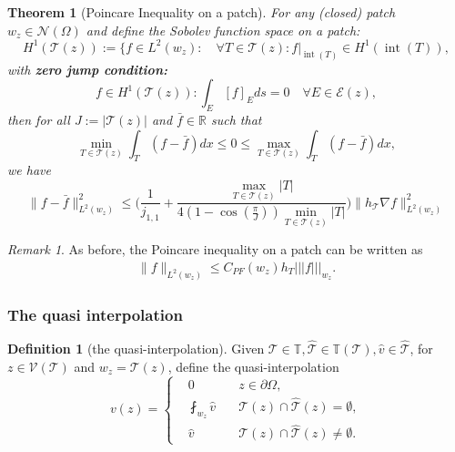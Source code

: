 \documentclass[a4paper,12pt,oneside,fleqn]{book}
\newtheorem{theorem}{Theorem}[section]
\theoremstyle{definition}
\newtheorem{definition}{Definition}[section]
\theoremstyle{remark}
\newtheorem*{remark}{Remark}
\DeclareMathOperator*{\interior}{int}
\begin{document}
 
\begin{theorem}[Poincare Inequality on a patch]
	For any (closed) patch $w_z \in \mathcal{N}(\Omega)$ and define the Sobolev function space on a patch:
	\begin{equation}
		H^1(\mathcal{T}(z)):= \{f \in L^2(w_z): \quad \forall T \in \mathcal{T}(z): f|_{\interior(T)} \in H^1(\interior(T)),
	\end{equation}
	with \textbf{zero jump condition:}
	\begin{equation}
		f \in H^1(\mathcal{T}(z)):  \int_E [f]_E ds = 0 \quad \forall E \in \mathcal{E}(z),
	\end{equation}
	then for all $J:= |\mathcal{T}(z)|$ and $\bar{f} \in \mathbb{R}$ such that
	\begin{equation*}
		\min_{T \in \mathcal{T}(z)} \int_T (f - \bar{f}) dx \le 0 \le \max_{T \in \mathcal{T}(z)} \int_T (f - \bar{f}) dx, 
	\end{equation*}
	we have
	\begin{equation}
		\|f - \bar{f}\|_{L^2(w_z)}^2 \le \bigg(\frac{1}{j_{1,1}} + \frac{\max_{T \in \mathcal{T}(z)}|T| }{4(1 - \cos(\frac{\pi}{J})) \min_{T \in \mathcal{T}(z)}|T|}\bigg) \|h_\mathcal{T} \nabla f\|_{L^2(w_z)}^2 
	\end{equation}
\end{theorem}
\begin{remark}
As before, the Poincare inequality on a patch can be written as 
\begin{align*}
	\|f\|_{L^2(w_z)} \le C_{PF}(w_z) h_T |||f|||_{w_z}. 
\end{align*}	
\end{remark}


\subsubsection{The quasi interpolation}
\begin{definition}[the quasi-interpolation]
	Given $\mathcal{T} \in \mathbb{T}, \hat{\mathcal{T}} \in \mathbb{T}(\mathcal{T}), \hat{v} \in \hat{\mathcal{T}}$, for $z \in \mathcal{V}(\mathcal{T})$ and $w_z = \mathcal{T}(z)$, define the quasi-interpolation
	\begin{equation}
		v(z) = \left\{
		\begin{aligned}
			& 0 \quad & z \in \partial\Omega,\\
			&\fint_{w_z} \hat{v} \quad & \mathcal{T}(z) \cap \hat{\mathcal{T}}(z) = \emptyset,\\
			& \hat{v} \quad & \mathcal{T}(z) \cap \hat{\mathcal{T}}(z)  \neq \emptyset. 
		\end{aligned}
		\right.
	\end{equation}
\end{definition}
\end{document}
